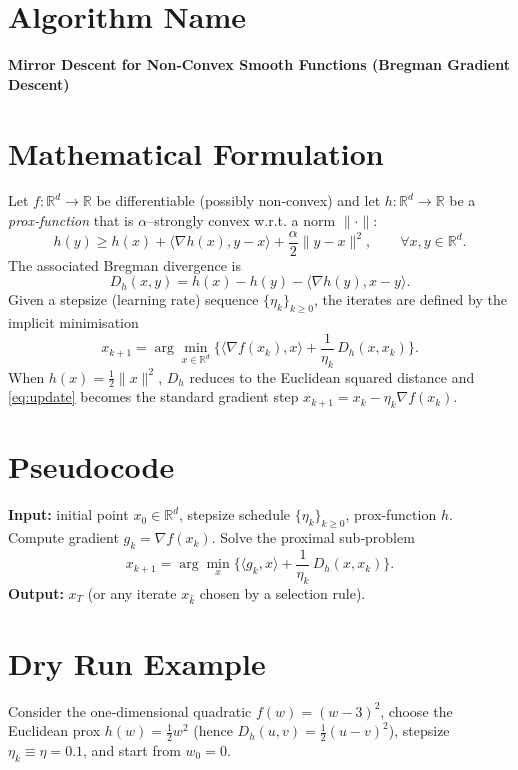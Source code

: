 \documentclass{article}
\newcommand{\ip}[2]{\langle #1,#2\rangle}
\newcommand{\grad}{\nabla}
\newcommand{\D}{D_{h}}
\newcommand{\R}{\mathbb{R}}
\begin{document}
\section*{Algorithm Name}
\textbf{Mirror Descent for Non‑Convex Smooth Functions (Bregman Gradient Descent)}

\section*{Mathematical Formulation}
Let $f:\R^{d}\rightarrow\R$ be differentiable (possibly non‑convex) and let $h:\R^{d}\rightarrow\R$ be a \emph{prox‑function} that is $\alpha$–strongly convex w.r.t. a norm $\|\cdot\|$:
\[
h(y)\ge h(x)+\ip{\grad h(x)}{y-x}+\frac{\alpha}{2}\|y-x\|^{2},\qquad\forall x,y\in\R^{d}.
\]
The associated Bregman divergence is
\[
\D(x,y)=h(x)-h(y)-\ip{\grad h(y)}{x-y}.
\]
Given a stepsize (learning rate) sequence $\{\eta_k\}_{k\ge0}$, the iterates are defined by the implicit minimisation
\begin{equation}
\label{eq:update}
x_{k+1}= \arg\min_{x\in\R^{d}}\Big\{ \ip{\grad f(x_k)}{x}+ \frac{1}{\eta_k}\,\D(x,x_k)\Big\}.
\end{equation}
When $h(x)=\frac12\|x\|^{2}$, $\D$ reduces to the Euclidean squared distance and \eqref{eq:update} becomes the standard gradient step
$x_{k+1}=x_k-\eta_k\grad f(x_k)$.

\section*{Pseudocode}
\begin{algorithm}[H]
\caption{Bregman Gradient Descent (Mirror Descent) }
\begin{algorithmic}[1]
\STATE \textbf{Input:} initial point $x_0\in\R^{d}$, stepsize schedule $\{\eta_k\}_{k\ge0}$, prox‑function $h$.
    \STATE Compute gradient $g_k=\grad f(x_k)$.
    \STATE Solve the proximal sub‑problem
    \[
    x_{k+1}= \arg\min_{x}\Big\{ \ip{g_k}{x}+ \frac{1}{\eta_k}\,\D(x,x_k)\Big\}.
    \]
\ENDFOR
\STATE \textbf{Output:} $x_T$ (or any iterate $x_{\hat k}$ chosen by a selection rule).
\end{algorithmic}
\end{algorithm}

\section*{Dry Run Example}
Consider the one‑dimensional quadratic $f(w)=(w-3)^{2}$, choose the Euclidean prox $h(w)=\frac12 w^{2}$ (hence $\D(u,v)=\frac12 (u-v)^{2}$), stepsize $\eta_k\equiv \eta=0.1$, and start from $w_{0}=0$.
\end{document}
